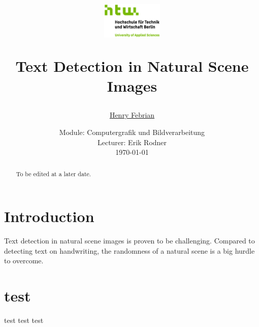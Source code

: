 \documentclass[a4paper]{article}
\begin{document}
	\title{
	\begin{figure}[!ht]
			\includegraphics[width=0.26\textwidth]{img/htwlogo.jpg}
	\end{figure}
	\vspace{1cm}
	\Huge Text Detection in Natural Scene Images
	}
	
	\vspace{1cm}
	
	
	\author{\Large \href{mailto:s0566146@htw-berlin.de}{Henry Febrian}
	\vspace{1cm}}
	
	\date{
	\large Module: Computergrafik und Bildverarbeitung \\
	\vspace{0.8cm}
	\large Lecturer: Erik Rodner \\
	\vspace{1cm}
	\today
	}

	\maketitle
	\setlength{\parindent}{0pt}

\vspace{2cm}
\begin{abstract}
To be edited at a later date.

\end{abstract}
	\newpage
	\tableofcontents
	\newpage
	
\section{Introduction} %
\label{sec:introduction}
Text detection in natural scene images is proven to be challenging. Compared to detecting text on handwriting, the randomness of a natural scene is a big hurdle to overcome. 

\section{test} %
\label{sec:test}
test test test
\end{document}
